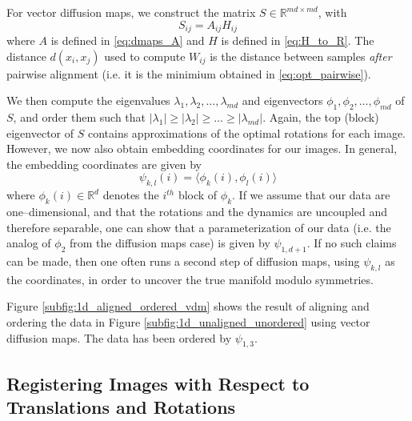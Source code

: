 \documentclass[11pt]{article}
\begin{document}
For vector diffusion maps, we construct the matrix $S \in \mathbb{R}^{md \times md}$, with
\begin{equation}
	S_{ij} = A_{ij} H_{ij}
\end{equation}
%
where $A$ is defined in \eqref{eq:dmaps_A} and $H$ is defined in \eqref{eq:H_to_R}.
%
The distance $d(x_i, x_j)$ used to compute $W_{ij}$ is the distance between samples {\em after} pairwise alignment (i.e. it is the minimium obtained in \eqref{eq:opt_pairwise}). 

We then compute the eigenvalues $\lambda_1, \lambda_2, \dots, \lambda_{md}$ and eigenvectors $\phi_1, \phi_2, \dots, \phi_{md}$ of $S$, and order them such that $|\lambda_1| \ge |\lambda_2| \ge \dots \ge |\lambda_{md}|$.
%
Again, the top (block) eigenvector of $S$ contains approximations of the optimal rotations for each image.
%
However, we now also obtain embedding coordinates for our images.
%
In general, the embedding coordinates are given by 
\begin{equation}
\psi_{k,l} (i) = \langle \phi_k(i), \phi_l(i) \rangle
\end{equation}
where $\phi_k(i) \in \mathbb{R}^d$ denotes the $i^{th}$ block of $\phi_k$.
%
If we assume that our data are one--dimensional, and that the rotations and the dynamics are uncoupled and therefore separable, one can show that a parameterization of our data (i.e. the analog of $\phi_2$ from the diffusion maps case) is given by $\psi_{1,d+1}$.
%
If no such claims can be made, then one often runs a second step of diffusion maps, using $\psi_{k,l}$ as the coordinates, in order to uncover the true manifold modulo symmetries. 

Figure \ref{subfig:1d_aligned_ordered_vdm} shows the result of aligning and ordering the data in Figure \ref{subfig:1d_unaligned_unordered} using vector diffusion maps. 
%
The data has been ordered by $\psi_{1, 3}$. 

\subsection{Registering Images with Respect to Translations and Rotations} \label{subsec:trans_rot_register}
\end{document}
